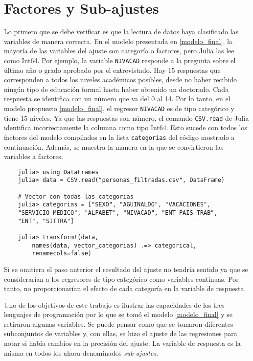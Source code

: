 \section{Factores y Sub-ajustes} \label{reg_categorias}

Lo primero que se debe verificar es que la lectura de datos haya clasificado las variables de manera correcta. En el modelo presentada en \ref{modelo_final}, la mayoría de las variables del ajuste son categoría o factores, pero \textsf{Julia} las lee como \textsf{Int64}. Por ejemplo, la variable \texttt{NIVACAD} responde a la pregunta sobre el último año o grado aprobado por el entrevistado. Hay 15 respuestas que corresponden a todos los niveles académicos posibles, desde no haber recibido ningún tipo de educación formal hasta haber obtenido un doctorado. Cada respuesta se identifica con un número que va del 0 al 14. Por lo tanto, en el modelo propuesto \ref{modelo_final}, el regresor \texttt{NIVACAD} es de tipo categórico y tiene 15 niveles. Ya que las respuestas son número, el comando \texttt{CSV.read} de \textsf{Julia} identifica incorrectamente la columna como tipo \textsf{Int64}. Esto sucede con todos los factores del modelo compilados en la lista \texttt{categorias} del código mostrado a continuación. Además, se muestra la manera en la que se convirtieron las variables a factores. 

\begin{verbatim}
	julia> using DataFrames
	julia> data = CSV.read("personas_filtradas.csv", DataFrame)

	# Vector con todas las categorias
	julia> categorias = ["SEXO", "AGUINALDO", "VACACIONES", 
	"SERVICIO_MEDICO", "ALFABET", "NIVACAD", "ENT_PAIS_TRAB", 
	"ENT", "SITTRA"]

	julia> transform!(data, 
		names(data, vector_categorias) .=> categorical, 
		renamecols=false)
\end{verbatim}

Si se omitiera el paso anterior el resultado del ajuste no tendría sentido ya que se considerarían a los regresores de tipo categórico como variables continuas. Por tanto, no proporcionarían el efecto de cada categoría en la variable de respuesta.

Uno de los objetivos de este trabajo es ilustrar las capacidades de los tres lenguajes de programación por lo que se tomó el modelo \ref{modelo_final} y se retiraron algunas variables. Se puede pensar como que se tomaron diferentes subconjuntos de variables y, con ellas, se hizo el ajuste de las regresiones para notar si había cambios en la precisión del ajuste. La variable de respuesta es la misma en todos los ahora denominados \textit{sub-ajustes}.

